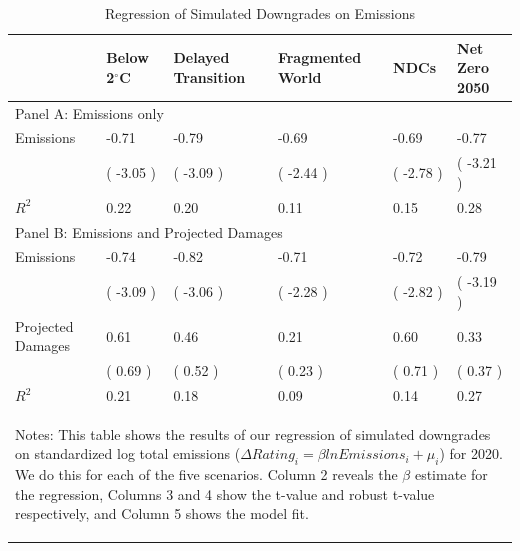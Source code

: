 
\begin{table}[tb!]
\footnotesize
\center
\caption{Regression of Simulated Downgrades on Emissions}
\label{tab:tab4}
\begin{tabularx}{\textwidth}{p{3cm} X X X X X}
\\
\hline
 & Below 2$^\circ$C & Delayed Transition & Fragmented World & NDCs & Net Zero 2050 \\
\hline
\multicolumn{6}{l}{Panel A: Emissions only}\\
\hline
Emissions  &  -0.71  &  -0.79  &  -0.69  &  -0.69  &  -0.77 \\
 & ( -3.05 ) & ( -3.09 ) & ( -2.44 ) & ( -2.78 ) & ( -3.21 )\\[0.1cm]
$R^{2}$  &  0.22  &  0.20  &  0.11  &  0.15  &  0.28 \\[0.1cm]
\hline
\multicolumn{6}{l}{Panel B: Emissions and Projected Damages}\\
\hline
Emissions  &  -0.74  &  -0.82  &  -0.71  &  -0.72  &  -0.79 \\
 & ( -3.09 ) & ( -3.06 ) & ( -2.28 ) & ( -2.82 ) & ( -3.19 )\\[0.1cm]
Projected Damages  &  0.61  &  0.46  &  0.21  &  0.60  &  0.33 \\
  & ( 0.69 ) & ( 0.52 ) & ( 0.23 ) & ( 0.71 ) & ( 0.37 )\\[0.1cm]
$R^{2}$  &  0.21  &  0.18  &  0.09  &  0.14  &  0.27 \\[0.1cm]
\hline
\multicolumn{6}{p{\textwidth}}{\begin{footnotesize}Notes: This table shows the results of our regression of simulated downgrades on standardized log total emissions ($\Delta Rating_{i} = \beta lnEmissions_{i} + \mu_{i}$) for 2020. We do this for each of the five scenarios. Column 2 reveals the $\beta$ estimate for the regression, Columns 3 and 4 show the t-value and robust t-value respectively, and Column 5 shows the model fit.
\end{footnotesize}
}
\end{tabularx}
\end{table}
